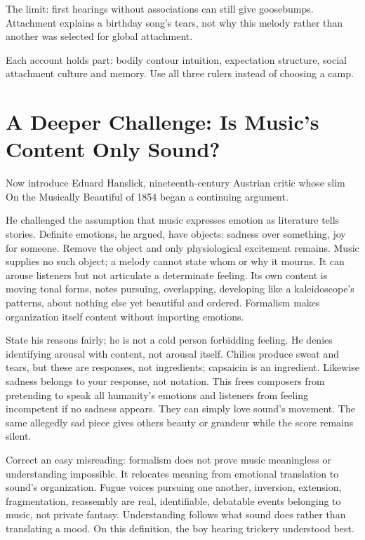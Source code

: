 The limit: first hearings without associations can still give goosebumps. Attachment explains a birthday song's tears, not why this melody rather than another was selected for global attachment.

Each account holds part: bodily contour intuition, expectation structure, social attachment culture and memory. Use all three rulers instead of choosing a camp.

\section[Is Music's Content Only Sound?]{A Deeper Challenge: Is Music's Content Only Sound?}
Now introduce Eduard Hanslick, nineteenth-century Austrian critic whose slim On the Musically Beautiful of 1854 began a continuing argument.

He challenged the assumption that music expresses emotion as literature tells stories. Definite emotions, he argued, have objects: sadness over something, joy for someone. Remove the object and only physiological excitement remains. Music supplies no such object; a melody cannot state whom or why it mourns. It can arouse listeners but not articulate a determinate feeling. Its own content is moving tonal forms, notes pursuing, overlapping, developing like a kaleidoscope's patterns, about nothing else yet beautiful and ordered. Formalism makes organization itself content without importing emotions.

State his reasons fairly; he is not a cold person forbidding feeling. He denies identifying arousal with content, not arousal itself. Chilies produce sweat and tears, but these are responses, not ingredients; capsaicin is an ingredient. Likewise sadness belongs to your response, not notation. This frees composers from pretending to speak all humanity's emotions and listeners from feeling incompetent if no sadness appears. They can simply love sound's movement. The same allegedly sad piece gives others beauty or grandeur while the score remains silent.

Correct an easy misreading: formalism does not prove music meaningless or understanding impossible. It relocates meaning from emotional translation to sound's organization. Fugue voices pursuing one another, inversion, extension, fragmentation, reassembly are real, identifiable, debatable events belonging to music, not private fantasy. Understanding follows what sound does rather than translating a mood. On this definition, the boy hearing trickery understood best.

